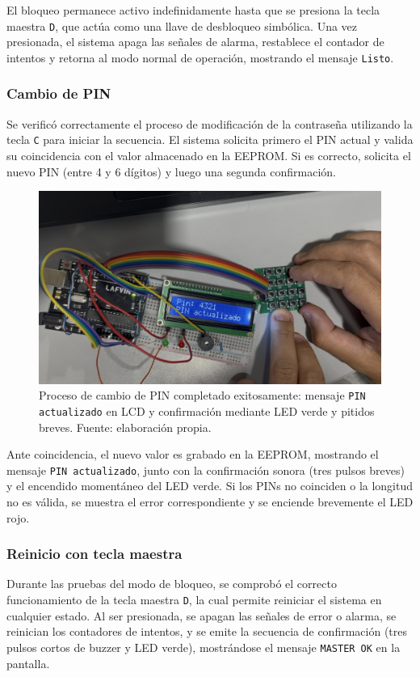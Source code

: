 El bloqueo permanece activo indefinidamente hasta que se presiona la tecla maestra \texttt{D}, 
que actúa como una llave de desbloqueo simbólica.  
Una vez presionada, el sistema apaga las señales de alarma, 
restablece el contador de intentos y retorna al modo normal de operación, mostrando el mensaje \texttt{Listo}.

\subsubsection{Cambio de PIN}

Se verificó correctamente el proceso de modificación de la contraseña utilizando la tecla \texttt{C} para iniciar la secuencia.  
El sistema solicita primero el PIN actual y valida su coincidencia con el valor almacenado en la EEPROM.  
Si es correcto, solicita el nuevo PIN (entre 4 y 6 dígitos) y luego una segunda confirmación.  

\begin{figure}[H]
    \centering
    \includegraphics[width=0.7\columnwidth]{Anexos/Cerradura_PINactualizado.png}
    \caption{Proceso de cambio de PIN completado exitosamente: mensaje \texttt{PIN actualizado} en LCD y confirmación mediante LED verde y pitidos breves. Fuente: elaboración propia.}
    \label{fig:cerradura_pin_actualizado}
\end{figure}

Ante coincidencia, el nuevo valor es grabado en la EEPROM, mostrando el mensaje \texttt{PIN actualizado}, 
junto con la confirmación sonora (tres pulsos breves) y el encendido momentáneo del LED verde.  
Si los PINs no coinciden o la longitud no es válida, se muestra el error correspondiente y se enciende brevemente el LED rojo.

\subsubsection{Reinicio con tecla maestra}

Durante las pruebas del modo de bloqueo, se comprobó el correcto funcionamiento de la tecla maestra \texttt{D}, 
la cual permite reiniciar el sistema en cualquier estado.  
Al ser presionada, se apagan las señales de error o alarma, se reinician los contadores de intentos, 
y se emite la secuencia de confirmación (tres pulsos cortos de buzzer y LED verde), 
mostrándose el mensaje \texttt{MASTER OK} en la pantalla.

